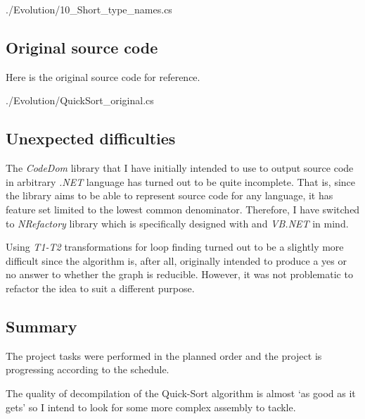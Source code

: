 \documentclass[12pt]{article}
\begin{document}

{./Evolution/10_Short_type_names.cs}

\newpage
\subsection*{Original source code}
Here is the original source code for reference.


{./Evolution/QuickSort_original.cs}

\newpage
\subsection*{Unexpected difficulties}

The \emph{CodeDom} library that I have initially intended to use
to output source code in arbitrary \emph{.NET} language has turned out to be
quite incomplete.  That is, since the library aims to be
able to represent source code for any language, it has 
feature set limited to the lowest common denominator.
Therefore, I have switched to \emph{NRefactory} library which
is specifically designed with \CS and \emph{VB.NET} in mind.

Using \emph{T1-T2} transformations for loop finding turned out to be
a slightly more difficult since the algorithm is, after all,
originally intended to produce a yes or no answer to whether the graph 
is reducible.  However, it was not problematic to refactor
the idea to suit a different purpose.

\subsection*{Summary}

The project tasks were performed in the planned order and
the project is progressing according to the schedule.

The quality of decompilation of the Quick-Sort algorithm is 
almost `as good as it gets' so I intend to look for some more
complex assembly to tackle.
\end{document}
